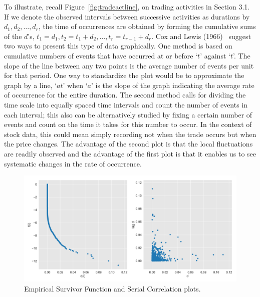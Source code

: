 To illustrate, recall Figure~\ref{fig:tradeactline}, on trading activities in Section 3.1. If we denote the observed intervals between successive activities as durations by $d_1, d_2, \ldots,d_r$, the time of occurrences are obtained by forming the cumulative sums of the $d$'s, $t_1= d_1, t_2= t_1 + d_2, \ldots, t_r=t_{r-1} + d_r$. Cox and Lewis (1966)~\cite{cox1966} suggest two ways to present this type of data graphically. One method is based on cumulative numbers of events that have occurred at or before `$t$' against `$t$'. The slope of the line between any two points is the average number of events per unit for that period. One way to standardize the plot would be to approximate the graph by a line, `$at$' when `$a$' is the slope of the graph indicating the average rate of occurrence for the entire duration. The second method calls for dividing the time scale into equally spaced time intervals and count the number of events in each interval; this also can be alternatively studied by fixing a certain number of events and count on the time it takes for this number to occur. In the context of stock data, this could mean simply recording not when the trade occurs but when the price changes. The advantage of the second plot is that the local fluctuations are readily observed and the advantage of the first plot is that it enables us to see systematic changes in the rate of occurrence.
 
 	\begin{figure}[!ht]
	\centering	
	\includegraphics[width=\textwidth]{chapters/chapter_advanced/figures/survivor.png}
	\caption{Empirical Survivor Function and Serial Correlation plots. \label{fig:survivor}}
	\end{figure}
	

